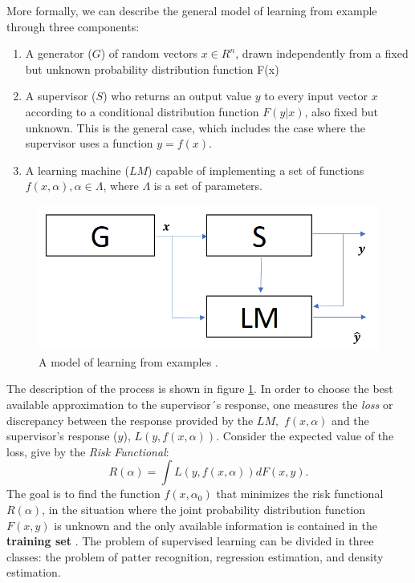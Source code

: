 More formally, we can describe the general model of learning from example through three components\cite{Vapnik2000}:
\begin{enumerate}[I]
	\item A generator ($G$) of random vectors $x \in R^n$, drawn independently from a fixed but unknown probability distribution function F(x)
	\item A supervisor ($S$) who returns an output value $y$ to every input vector $x$ according to a conditional distribution function $F(y|x)$, also fixed but unknown. This is the general case, which includes the case where the supervisor uses a function $y = f(x)$.
	\item A learning machine ($LM$) capable of implementing a set of functions $f(x, \alpha), \alpha \in \Lambda$, where $\Lambda$ is a set of parameters.
\end{enumerate}
\begin{figure}[ht!]
	\centering
	\includegraphics[width=0.7\linewidth]{TeX_files/Imagenes/ML_diagram}
	\caption{A model of learning from examples \cite{Vapnik2000}.}
	\label{fig:mldiagram}
\end{figure}
The description of the process is shown in figure \ref{fig:mldiagram}. In order to choose the best available approximation to the supervisor´s response, one measures the \textit{loss} or discrepancy between the response provided by the $LM, \, \, f(x, \alpha)$ and the supervisor's response ($y$), $L(y, f(x, \alpha))$. Consider the expected value of the loss, give by the \textit{Risk Functional}:
\begin{equation}
R(\alpha) = \int L(y, f(x, \alpha))dF(x, y).
\end{equation}
The goal is to find the function $f(x, \alpha_0)$ that minimizes the risk functional $R(\alpha)$, in the situation where the joint probability distribution function $F(x, y)$ is unknown and the only available information is contained in the \textbf{training set} \cite{Vapnik2000}. The problem of supervised learning can be divided in three classes: the problem of patter recognition, regression estimation, and density estimation. 
